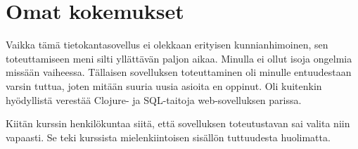 \documentclass[a4paper,titlepage]{article}
\begin{document}
\section{Omat kokemukset}

Vaikka tämä tietokantasovellus ei olekkaan erityisen kunnianhimoinen,
sen toteuttamiseen meni silti yllättävän paljon aikaa. Minulla ei
ollut isoja ongelmia missään vaiheessa. Tällaisen sovelluksen
toteuttaminen oli minulle entuudestaan varsin tuttua, joten mitään
suuria uusia asioita en oppinut. Oli kuitenkin hyödyllistä verestää
Clojure- ja SQL-taitoja web-sovelluksen parissa.

Kiitän kurssin henkilökuntaa siitä, että sovelluksen toteutustavan sai
valita niin vapaasti. Se teki kurssista mielenkiintoisen sisällön
tuttuudesta huolimatta.
\end{document}
